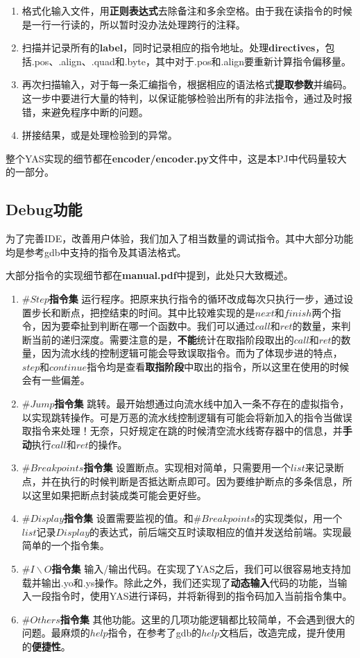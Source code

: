 \documentclass[12pt]{article} %
\begin{document}
\begin{sloppypar}
\begin{enumerate}
\item 格式化输入文件，用{\bf 正则表达式}去除备注和多余空格。由于我在读指令的时候是一行一行读的，所以暂时没办法处理跨行的注释。
\item 扫描并记录所有的{\bf label}，同时记录相应的指令地址。处理{\bf directives}，包括.pos、.align、.quad和.byte，其中对于.pos和.align要重新计算指令偏移量。
\item 再次扫描输入，对于每一条汇编指令，根据相应的语法格式{\bf 提取参数}并编码。这一步中要进行大量的特判，以保证能够检验出所有的非法指令，通过及时报错，来避免程序中断的问题。
\item 拼接结果，或是处理检验到的异常。
\end{enumerate}

整个YAS实现的细节都在{\bf encoder/encoder.py}文件中，这是本PJ中代码量较大的一部分。

\subsection{Debug功能}

为了完善IDE，改善用户体验，我们加入了相当数量的调试指令。其中大部分功能均是参考gdb中支持的指令及其语法格式。

大部分指令的实现细节都在{\bf manual.pdf}中提到，此处只大致概述。
\begin{enumerate}
\item {\bf $\#Step$指令集} \quad 运行程序。把原来执行指令的循环改成每次只执行一步，通过设置步长和断点，把控结束的时间。其中比较难实现的是$next$和$finish$两个指令，因为要牵扯到判断在哪一个函数中。我们可以通过$call$和$ret$的数量，来判断当前的递归深度。需要注意的是，{\bf 不能}统计在取指阶段取出的$call$和$ret$的数量，因为流水线的控制逻辑可能会导致误取指令。而为了体现步进的特点，$step$和$continue$指令均是查看{\bf 取指阶段}中取出的指令，所以这里在使用的时候会有一些偏差。
\item {\bf $\#Jump$指令集} \quad 跳转。最开始想通过向流水线中加入一条不存在的虚拟指令，以实现跳转操作。可是万恶的流水线控制逻辑有可能会将新加入的指令当做误取指令来处理！无奈，只好规定在跳的时候清空流水线寄存器中的信息，并{\bf 手动}执行$call$和$ret$的操作。
\item {\bf $\#Breakpoints$指令集} \quad 设置断点。实现相对简单，只需要用一个$list$来记录断点，并在执行的时候判断是否抵达断点即可。因为要维护断点的多条信息，所以这里如果把断点封装成类可能会更好些。
\item {\bf $\#Display$指令集} \quad 设置需要监视的值。和$\#Breakpoints$的实现类似，用一个$list$记录$Display$的表达式，前后端交互时读取相应的值并发送给前端。实现最简单的一个指令集。
\item {\bf $\#I\backslash O$指令集} \quad 输入/输出代码。在实现了YAS之后，我们可以很容易地支持加载并输出.yo和.ys操作。除此之外，我们还实现了{\bf 动态输入}代码的功能，当输入一段指令时，使用YAS进行译码，并将新得到的指令码加入当前指令集中。
\item {\bf $\#Others$指令集} \quad 其他功能。这里的几项功能逻辑都比较简单，不会遇到很大的问题。最麻烦的$help$指令，在参考了gdb的$help$文档后，改造完成，提升使用的{\bf 便捷性}。
\end{enumerate}


\end{sloppypar}
\end{document}
